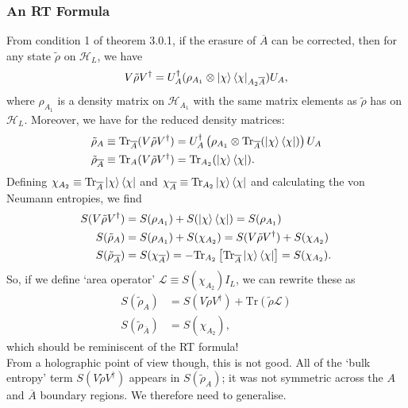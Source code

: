 \documentclass[12pt,a4paper]{report}
\numberwithin{equation}{section}
\newcommand{\ketbra}[2]{\ket{#1}\bra{#2}}
\newcommand{\ketbras}[1]{\ketbra{#1}{#1}}
\newcommand{\ol}[1]{\overline{#1}}
\newcommand{\tr}{\text{Tr}}
\theoremstyle{definition}
\theoremstyle{theorem}
\theoremstyle{theorem}
\theoremstyle{example}
\theoremstyle{definition}
\begin{document}
\subsubsection{An RT Formula}
From condition 1 of theorem 3.0.1, if the erasure of $\ol{A}$ can be corrected, then for any state $\tilde{\rho}$ on $\mathcal{H}_{L}$, we have
\begin{equation}
	V\tilde{\rho}V^{\dagger}=U_{A}^{\dagger}(\rho_{A_{1}}\otimes\ketbras{\chi}_{A_{2}\ol{A}})U_{A},
\end{equation}
where $\rho_{A_{1}}$ is a density matrix on $\mathcal{H}_{A_{1}}$ with the same matrix elements as $\tilde{\rho}$ has on $\mathcal{H}_{L}$. Moreover, we have for the reduced density matrices:
\begin{equation}
	\begin{aligned}
		\tilde{\rho}_{A}&\equiv\tr_{\ol{A}}(V\tilde{\rho}V^{\dagger})=U_{A}^{\dagger}\left(\rho_{A_{1}}\otimes \tr_{\ol{A}}(\ketbras{\chi})\right)U_{A}\\
		\tilde{\rho}_{\ol{A}}&\equiv\tr_{A}(V\tilde{\rho}V^{\dagger})=\tr_{A_{2}}(\ketbras{\chi}).
	\end{aligned}
\end{equation}
Defining $\chi_{A_{2}}\equiv\tr_{\ol{A}}\ketbras{\chi}$ and $\chi_{\ol{A}}\equiv\tr_{A_{2}}\ketbras{\chi}$ and calculating the von Neumann entropies, we find
\begin{equation}
	\begin{aligned}
		S(V\tilde{\rho}V^{\dagger})&=S(\rho_{A_{1}})+S(\ketbras{\chi})=S(\rho_{A_{1}})\\
		S(\tilde{\rho}_{A})&=S(\rho_{A_{1}})+S(\chi_{A_{2}})=S(V\tilde{\rho}V^{\dagger})+S(\chi_{A_{2}})\\
		S(\tilde{\rho}_{\ol{A}})&=S(\chi_{\ol{A}})=-\tr_{A_{2}}\left[\tr_{\ol{A}}\ketbras{\chi}\right]=S(\chi_{A_{2}}).
	\end{aligned}
\end{equation}
So, if we define `area operator' $\mathcal{L}\equiv S(\chi_{A_{2}})I_{L}$, we can rewrite these as
\begin{equation}
	\begin{aligned}
		S(\tilde{\rho}_{A})&=S(V\tilde{\rho}V^{\dagger})+\tr(\tilde{\rho}\mathcal{L})\\
		S(\tilde{\rho}_{\ol{A}})&=S(\chi_{A_{2}}),
	\end{aligned}
\end{equation}
which should be reminiscent of the RT formula!\\
From a holographic point of view though, this is not good. All of the `bulk entropy' term $S(V\tilde{\rho}V^{\dagger})$ appears in $S(\tilde{\rho}_{A})$; it was not symmetric across the $A$ and $\ol{A}$ boundary regions. We therefore need to generalise.
\end{document}
